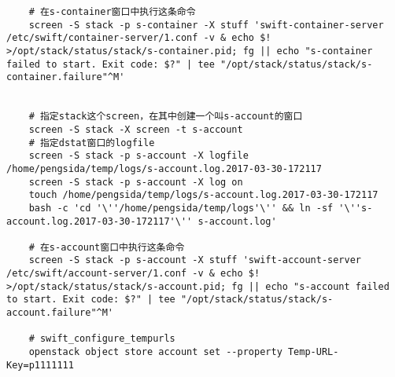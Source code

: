 \documentclass[a4paper,left=1.5cm,right=1.5cm,11pt]{article}
\begin{document}
\begin{lstlisting}
	# 在s-container窗口中执行这条命令
	screen -S stack -p s-container -X stuff 'swift-container-server /etc/swift/container-server/1.conf -v & echo $! >/opt/stack/status/stack/s-container.pid; fg || echo "s-container failed to start. Exit code: $?" | tee "/opt/stack/status/stack/s-container.failure"^M'

	
	# 指定stack这个screen，在其中创建一个叫s-account的窗口
	screen -S stack -X screen -t s-account
	# 指定dstat窗口的logfile
	screen -S stack -p s-account -X logfile /home/pengsida/temp/logs/s-account.log.2017-03-30-172117
    screen -S stack -p s-account -X log on
	touch /home/pengsida/temp/logs/s-account.log.2017-03-30-172117
    bash -c 'cd '\''/home/pengsida/temp/logs'\'' && ln -sf '\''s-account.log.2017-03-30-172117'\'' s-account.log'

	# 在s-account窗口中执行这条命令
	screen -S stack -p s-account -X stuff 'swift-account-server /etc/swift/account-server/1.conf -v & echo $! >/opt/stack/status/stack/s-account.pid; fg || echo "s-account failed to start. Exit code: $?" | tee "/opt/stack/status/stack/s-account.failure"^M'

	# swift_configure_tempurls
	openstack object store account set --property Temp-URL-Key=p1111111
	\end{lstlisting}
\end{document}
